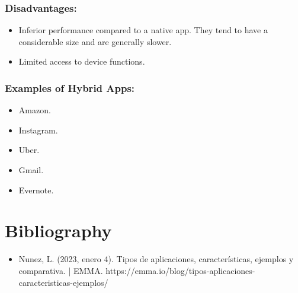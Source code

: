 \documentclass{article}
\begin{document}
\subsubsection*{Disadvantages:}
\begin{itemize}
    \item Inferior performance compared to a native app. They tend to have a considerable size and are generally slower.
    \item Limited access to device functions.
\end{itemize}

\subsubsection*{Examples of Hybrid Apps:}
\begin{itemize}
    \item Amazon.
    \item Instagram.
    \item Uber.
    \item Gmail.
    \item Evernote.
\end{itemize}

\section{Bibliography}
\begin{itemize}
\item Nunez, L. (2023, enero 4). Tipos de aplicaciones, características, ejemplos y comparativa. | EMMA. https://emma.io/blog/tipos-aplicaciones-caracteristicas-ejemplos/
\end{itemize}
\end{document}
